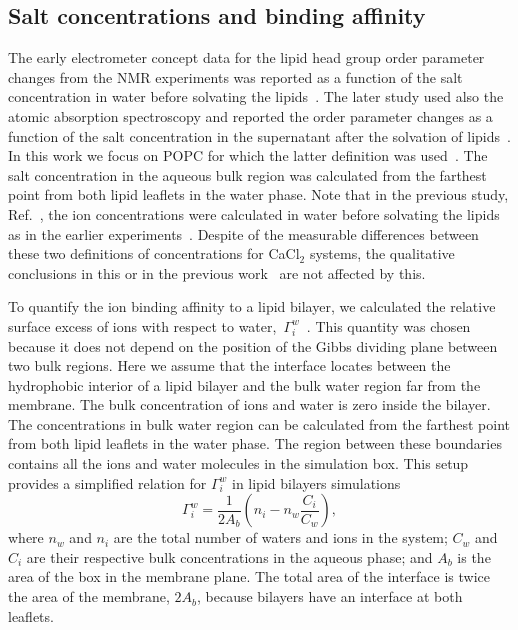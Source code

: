 \documentclass[aip,jcp,twocolumn]{revtex4}
\begin{document}
\subsection{Salt concentrations and binding affinity}
The early electrometer concept data for the lipid head group
order parameter changes from the NMR experiments was reported as a function 
of the salt concentration in water before solvating
the lipids~\cite{akutsu81}. The later study used also the atomic absorption
spectroscopy and reported the order parameter changes as
a function of the salt concentration in the supernatant after the
solvation of lipids~\cite{altenbach84}.
In this work we focus on POPC for which the latter definition was used~\cite{altenbach84}.
The salt concentration in the aqueous bulk region was calculated from 
the farthest point from both lipid leaflets in the water phase. 
Note that in the previous study, Ref.~,
the ion concentrations were calculated in water before solvating the lipids 
as in the earlier experiments~\cite{akutsu81}.
Despite of the measurable differences between these two
definitions of concentrations for CaCl$_2$ systems,
the qualitative conclusions in this or in the previous work~\cite{catte16} are
not affected by this. 

To quantify the ion binding affinity to a lipid bilayer, we
calculated the relative surface excess of ions with respect to water,~$\Gamma_i^w$~\cite{chattorajBOOK}.
This quantity was chosen because it does not depend on
the position of the Gibbs dividing plane between two bulk regions.
Here we assume that the interface locates between the hydrophobic interior
of a lipid bilayer and the bulk water region far from the membrane.
The bulk concentration of ions and water is zero inside the bilayer.
The concentrations in bulk water region can be calculated from 
the farthest point from both lipid leaflets in the water phase.
The region between these boundaries contains all the ions and water
molecules in the simulation box.
This setup provides a simplified relation for $\Gamma_i^w$ in lipid bilayers simulations 
\begin{equation}\label{surfexcess}
  \Gamma_i^w=\frac{1}{2A_b} \left ( n_i - n_w \frac{C_i}{C_w} \right ) ,
\end{equation}
where $n_w$ and $n_i$ are the total number of waters and ions in the system;
$C_w$ and $C_i$ are their respective bulk concentrations in the aqueous phase;
and $A_b$ is the area of the box in the membrane plane.
The total area of the interface is twice the area of the membrane, $2A_b$,
because bilayers have an interface at both leaflets.
\end{document}
